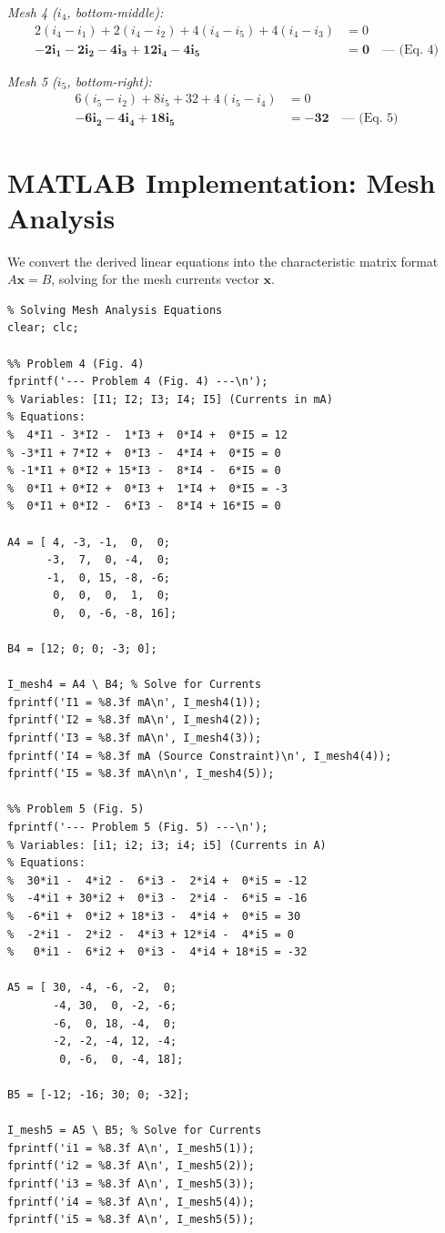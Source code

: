 \documentclass[11pt]{article}
\begin{document}
\textit{Mesh 4 ($i_4$, bottom-middle):}
\begin{align*}
  2(i_4 - i_1) + 2(i_4 - i_2) + 4(i_4 - i_5) + 4(i_4 - i_3) &= 0 \\
  \mathbf{-2i_1 - 2i_2 - 4i_3 + 12i_4 - 4i_5} &\mathbf{= 0} \quad \text{--- (Eq. 4)}
\end{align*}

\textit{Mesh 5 ($i_5$, bottom-right):}
\begin{align*}
  6(i_5 - i_2) + 8i_5 + 32 + 4(i_5 - i_4) &= 0 \\
  \mathbf{-6i_2 - 4i_4 + 18i_5} &\mathbf{= -32} \quad \text{--- (Eq. 5)}
\end{align*}

\section*{MATLAB Implementation: Mesh Analysis}
We convert the derived linear equations into the characteristic matrix format $A \mathbf{x} = B$, solving for the mesh currents vector $\mathbf{x}$.

\begin{lstlisting}[caption=MATLAB Script for Lab 3 Mesh Analysis (Problems 4 \& 5)]
% ENGR 212 - Laboratory Experiment 3
% Solving Mesh Analysis Equations
clear; clc;

%% Problem 4 (Fig. 4)
fprintf('--- Problem 4 (Fig. 4) ---\n');
% Variables: [I1; I2; I3; I4; I5] (Currents in mA)
% Equations:
%  4*I1 - 3*I2 -  1*I3 +  0*I4 +  0*I5 = 12
% -3*I1 + 7*I2 +  0*I3 -  4*I4 +  0*I5 = 0
% -1*I1 + 0*I2 + 15*I3 -  8*I4 -  6*I5 = 0
%  0*I1 + 0*I2 +  0*I3 +  1*I4 +  0*I5 = -3
%  0*I1 + 0*I2 -  6*I3 -  8*I4 + 16*I5 = 0

A4 = [ 4, -3, -1,  0,  0;
      -3,  7,  0, -4,  0;
      -1,  0, 15, -8, -6;
       0,  0,  0,  1,  0;
       0,  0, -6, -8, 16];

B4 = [12; 0; 0; -3; 0];

I_mesh4 = A4 \ B4; % Solve for Currents
fprintf('I1 = %8.3f mA\n', I_mesh4(1));
fprintf('I2 = %8.3f mA\n', I_mesh4(2));
fprintf('I3 = %8.3f mA\n', I_mesh4(3));
fprintf('I4 = %8.3f mA (Source Constraint)\n', I_mesh4(4));
fprintf('I5 = %8.3f mA\n\n', I_mesh4(5));

%% Problem 5 (Fig. 5)
fprintf('--- Problem 5 (Fig. 5) ---\n');
% Variables: [i1; i2; i3; i4; i5] (Currents in A)
% Equations:
%  30*i1 -  4*i2 -  6*i3 -  2*i4 +  0*i5 = -12
%  -4*i1 + 30*i2 +  0*i3 -  2*i4 -  6*i5 = -16
%  -6*i1 +  0*i2 + 18*i3 -  4*i4 +  0*i5 = 30
%  -2*i1 -  2*i2 -  4*i3 + 12*i4 -  4*i5 = 0
%   0*i1 -  6*i2 +  0*i3 -  4*i4 + 18*i5 = -32

A5 = [ 30, -4, -6, -2,  0;
       -4, 30,  0, -2, -6;
       -6,  0, 18, -4,  0;
       -2, -2, -4, 12, -4;
        0, -6,  0, -4, 18];

B5 = [-12; -16; 30; 0; -32];

I_mesh5 = A5 \ B5; % Solve for Currents
fprintf('i1 = %8.3f A\n', I_mesh5(1));
fprintf('i2 = %8.3f A\n', I_mesh5(2));
fprintf('i3 = %8.3f A\n', I_mesh5(3));
fprintf('i4 = %8.3f A\n', I_mesh5(4));
fprintf('i5 = %8.3f A\n', I_mesh5(5));
\end{lstlisting}
\end{document}
